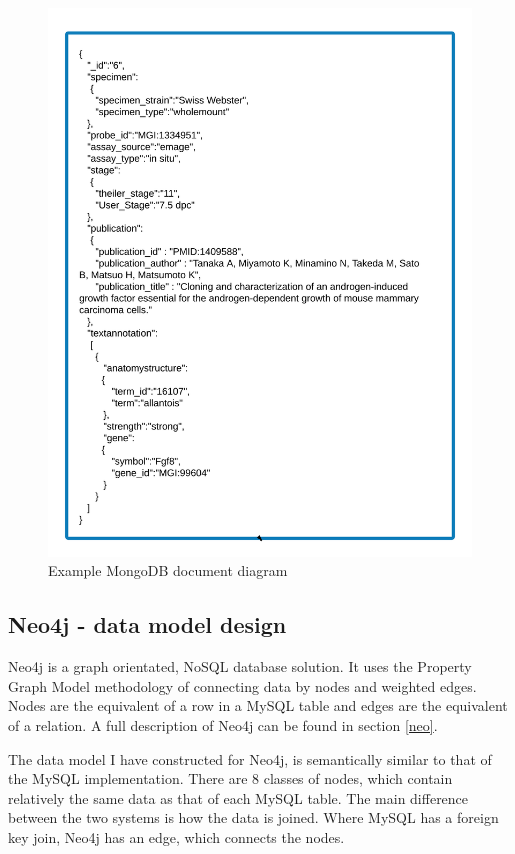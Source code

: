 \newpage
\begin{figure}[H]\begin{center}\includegraphics[width=1\linewidth]{images/mongo_modeldesign}\caption{Example MongoDB document diagram}\label{fig:mongo}\end{center}\end{figure}

\newpage
\subsection{Neo4j - data model design}\label{neomodel}
Neo4j is a graph orientated, NoSQL database solution. It uses the Property Graph Model methodology of connecting data by nodes and weighted edges. Nodes are the equivalent of a row in a MySQL table and edges are the equivalent of a relation. A full description of Neo4j can be found in section \ref{neo}.

The data model I have constructed for Neo4j, is semantically similar to that of the MySQL implementation. There are 8 classes of nodes, which contain relatively the same data as that of each MySQL table. The main difference between the two systems is how the data is joined. Where MySQL has a foreign key join, Neo4j has an edge, which connects the nodes.

